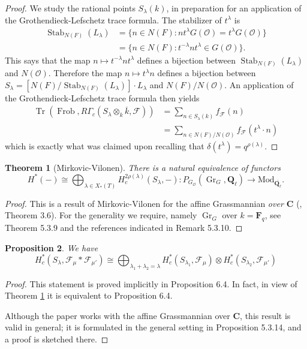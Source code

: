 \documentclass[reqno]{amsart}
\numberwithin{equation}{section}
\newcommand{\F}{\mathbf{F}}
\newcommand{\CC}{\mathbf{C}}
\newcommand{\Q}{\mathbf{Q}}
\newcommand{\ol}[1]{\overline{#1}}
\newcommand{\Cal}[1]{\mathcal{#1}}
\newcommand{\co}{\colon}
\newcommand{\mrm}[1]{\mathrm{#1}}
\DeclareMathOperator{\Frob}{Frob}
\DeclareMathOperator{\Tr}{Tr}
\DeclareMathOperator{\Stab}{Stab}
\DeclareMathOperator{\Gr}{Gr}
\newtheorem{thm}{Theorem}[section]
\newtheorem{prop}[thm]{Proposition}
\theoremstyle{remark}
\numberwithin{equation}{section}
\begin{document}
\begin{proof}We study the rational points $S_{\lambda}(k)$, in preparation for an application of the Grothendieck-Lefschetz trace formula. The stabilizer of $t^{\lambda}$ is 
\begin{align*}
\Stab_{N(F)}(L_{\lambda}) &= \{ n\in N(F) \co nt^{\lambda} G(\Cal{O})  = t^{\lambda} G(\Cal{O})\}   \\
&= \{ n\in N(F) \co t^{-\lambda} n t^{\lambda} \in G(\Cal{O})\}.
\end{align*}
This says that the map $n \mapsto t^{-\lambda} n t^{\lambda}$ defines a bijection between $\Stab_{N(F)}(L_{\lambda})$ and $N(\Cal{O})$. Therefore the map $n \mapsto t^{\lambda} n$ defines a bijection between $S_{\lambda} = [N(F)/\Stab_{N(F)}(L_{\lambda})] \cdot L_{\lambda}$ and $N(F)/N(\Cal{O})$. An application of the Grothendieck-Lefschetz trace formula then yields
\begin{align*}
\Tr(\Frob, R\Gamma_c (S_{\lambda} \otimes_k \ol{k}, \Cal{F})) &=  
\sum_{n \in S_{\lambda}(k)} f_{\Cal{F}}(n) \\
&= \sum_{n \in N(F)/N(\Cal{O})} f_{\Cal{F}}(t^{\lambda} \cdot n) 
\end{align*}
which is exactly what was claimed upon recalling that $\delta(t^{\lambda}) = q^{\rho(\lambda)}$. 
\end{proof}

\begin{thm}[Mirkovic-Vilonen]\label{thm: mv thm 1}
There is a natural equivalence of functors
\[
H^*(-) \cong \bigoplus_{\lambda \in X_*(T)} H_c^{2\rho(\lambda)}(S_{\lambda}, -) \co P_{G_{\Cal{O}}} (\Gr_G, \Q_{\ell}) \rightarrow \mrm{Mod}_{\ol{\Q_{\ell}}}.
\]
\end{thm}

\begin{proof}
This is a result of Mirkovic-Vilonen for the affine Grassmannian \emph{over $\CC$} (\cite{MV07}, Theorem 3.6). For the generality we require, namely $\Gr_G$ over $k = \F_q$, see \cite{Zhu15} Theorem 5.3.9 and the references indicated in \cite{Zhu15} Remark 5.3.10. 
\end{proof}


\begin{prop}\label{cohomology of convolution}
We have
\[
H^*_c(S_{\lambda}, \Cal{F}_{\mu} * \Cal{F}_{\mu'})   \cong  \bigoplus_{\lambda_1+\lambda_2 = \lambda} H^*_c(S_{\lambda_1}, \Cal{F}_{\mu}) \otimes H^*_c(S_{\lambda_2}, \Cal{F}_{\mu'}) 
\]
\end{prop}

\begin{proof}
This statement is proved implicitly in \cite{MV07} Proposition 6.4. In fact, in view of Theorem \ref{thm: mv thm 1} it is equivalent to \cite{MV07} Proposition 6.4. 

Although the paper \cite{MV07} works with the affine Grassmannian over $\CC$, this result is valid in general; it is formulated in the general setting in \cite{Zhu15} Proposition 5.3.14, and a proof is sketched there. 

\end{proof}
\end{document}
